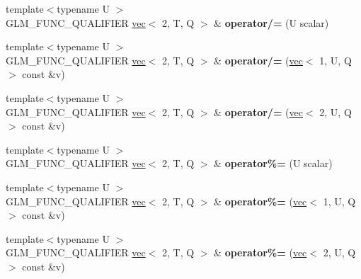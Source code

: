 \begin{DoxyCompactItemize}
{\footnotesize template$<$typename U $>$ }\\G\+L\+M\+\_\+\+F\+U\+N\+C\+\_\+\+Q\+U\+A\+L\+I\+F\+I\+ER \hyperlink{structglm_1_1vec}{vec}$<$ 2, T, Q $>$ \& {\bfseries operator/=} (U scalar)
\item 
\mbox{\label{structglm_1_1vec_3_012_00_01T_00_01Q_01_4_a686a525ae543252f200caac18da57c58}} 
{\footnotesize template$<$typename U $>$ }\\G\+L\+M\+\_\+\+F\+U\+N\+C\+\_\+\+Q\+U\+A\+L\+I\+F\+I\+ER \hyperlink{structglm_1_1vec}{vec}$<$ 2, T, Q $>$ \& {\bfseries operator/=} (\hyperlink{structglm_1_1vec}{vec}$<$ 1, U, Q $>$ const \&v)
\item 
\mbox{\label{structglm_1_1vec_3_012_00_01T_00_01Q_01_4_aad3c8d0a01f1f7b325d450ecd7641e55}} 
{\footnotesize template$<$typename U $>$ }\\G\+L\+M\+\_\+\+F\+U\+N\+C\+\_\+\+Q\+U\+A\+L\+I\+F\+I\+ER \hyperlink{structglm_1_1vec}{vec}$<$ 2, T, Q $>$ \& {\bfseries operator/=} (\hyperlink{structglm_1_1vec}{vec}$<$ 2, U, Q $>$ const \&v)
\item 
\mbox{\label{structglm_1_1vec_3_012_00_01T_00_01Q_01_4_a48f3476d27c4527802ddd58aa7762f64}} 
{\footnotesize template$<$typename U $>$ }\\G\+L\+M\+\_\+\+F\+U\+N\+C\+\_\+\+Q\+U\+A\+L\+I\+F\+I\+ER \hyperlink{structglm_1_1vec}{vec}$<$ 2, T, Q $>$ \& {\bfseries operator\%=} (U scalar)
\item 
\mbox{\label{structglm_1_1vec_3_012_00_01T_00_01Q_01_4_a267102cc597898b31585143684c70530}} 
{\footnotesize template$<$typename U $>$ }\\G\+L\+M\+\_\+\+F\+U\+N\+C\+\_\+\+Q\+U\+A\+L\+I\+F\+I\+ER \hyperlink{structglm_1_1vec}{vec}$<$ 2, T, Q $>$ \& {\bfseries operator\%=} (\hyperlink{structglm_1_1vec}{vec}$<$ 1, U, Q $>$ const \&v)
\item 
\mbox{\label{structglm_1_1vec_3_012_00_01T_00_01Q_01_4_a28092b816bf44c13025e22c1cdf53d68}} 
{\footnotesize template$<$typename U $>$ }\\G\+L\+M\+\_\+\+F\+U\+N\+C\+\_\+\+Q\+U\+A\+L\+I\+F\+I\+ER \hyperlink{structglm_1_1vec}{vec}$<$ 2, T, Q $>$ \& {\bfseries operator\%=} (\hyperlink{structglm_1_1vec}{vec}$<$ 2, U, Q $>$ const \&v)

\end{DoxyCompactItemize}
